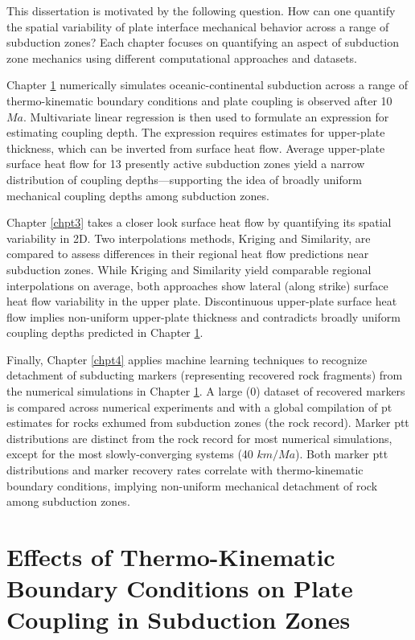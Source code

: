 This dissertation is motivated by the following question. How can one quantify the spatial variability of plate interface mechanical behavior across a range of subduction zones? Each chapter focuses on quantifying an aspect of subduction zone mechanics using different computational approaches and datasets.

Chapter \ref{chpt2} numerically simulates oceanic-continental subduction across a range of thermo-kinematic boundary conditions and plate coupling is observed after 10 \(Ma\). Multivariate linear regression is then used to formulate an expression for estimating coupling depth. The expression requires estimates for upper-plate thickness, which can be inverted from surface heat flow. Average upper-plate surface heat flow for 13 presently active subduction zones yield a narrow distribution of coupling depths---supporting the idea of broadly uniform mechanical coupling depths among subduction zones.

Chapter \ref{chpt3} takes a closer look surface heat flow by quantifying its spatial variability in 2D. Two interpolations methods, Kriging and Similarity, are compared to assess differences in their regional heat flow predictions near subduction zones. While Kriging and Similarity yield comparable regional interpolations on average, both approaches show lateral (along strike) surface heat flow variability in the upper plate. Discontinuous upper-plate surface heat flow implies non-uniform upper-plate thickness and contradicts broadly uniform coupling depths predicted in Chapter \ref{chpt2}.

Finally, Chapter \ref{chpt4} applies machine learning techniques to recognize detachment of subducting markers (representing recovered rock fragments) from the numerical simulations in Chapter \ref{chpt2}. A large (0)  dataset of recovered markers is compared across numerical experiments and with a global compilation of \gls{pt} estimates for rocks exhumed from subduction zones (the rock record). Marker \gls{ptt} distributions are distinct from the rock record for most numerical simulations, except for the most slowly-converging systems (40 \(km/Ma\)). Both marker \gls{ptt} distributions and marker recovery rates correlate with thermo-kinematic boundary conditions, implying non-uniform mechanical detachment of rock among subduction zones.

\cleardoublepage

\hypertarget{chpt2}{%
\chapter{Effects of Thermo-Kinematic Boundary Conditions on Plate Coupling in Subduction Zones}\label{chpt2}}

